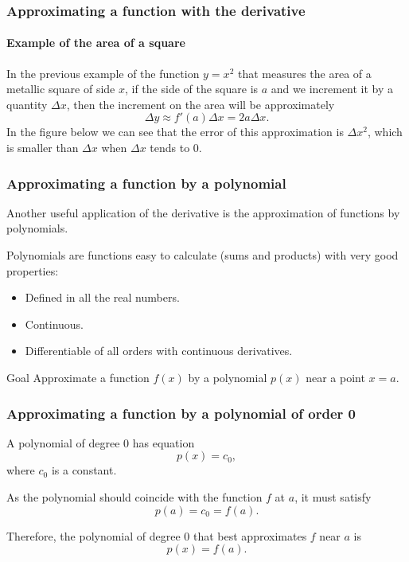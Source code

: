 \begin{frame}
	\frametitle{Approximating a function with the derivative}
	\framesubtitle{Example of the area of a square}
	In the previous example of the function $y=x^2$ that measures the area of a metallic square of side $x$, if the side of the square is $a$ and we increment it by a quantity $\Delta x$, then the increment on the area will be approximately
	\[
		\Delta y \approx f'(a)\Delta x = 2a\Delta x.
	\]
	In the figure below we can see that the error of this approximation is $\Delta x^2$, which is smaller than $\Delta x$ when $\Delta x$ tends to 0. 
	\begin{center}
	\end{center}
\end{frame}


\begin{frame}
	\frametitle{Approximating a function by a polynomial}
	Another useful application of the derivative is the approximation of functions by polynomials.
	
	Polynomials are functions easy to calculate (sums and products) with very good properties:
	\begin{itemize}
		\item Defined in all the real numbers.
		\item Continuous.
		\item Differentiable of all orders with continuous derivatives.
	\end{itemize}
	
	\begin{block}{Goal}
		Approximate a function $f(x)$ by a polynomial $p(x)$ near a point $x=a$.
	\end{block}
\end{frame}


\begin{frame}
	\frametitle{Approximating a function by a polynomial of order 0}
	A polynomial of degree 0 has equation
	\[
		p(x) = c_0,
	\]
	where $c_0$ is a constant.
	
	As the polynomial should coincide with the function $f$ at $a$, it must satisfy
	\[p(a) = c_0 = f(a).\]
	
	Therefore, the polynomial of degree 0 that best approximates $f$ near $a$ is
	\[p(x) = f(a).\]
\end{frame}


